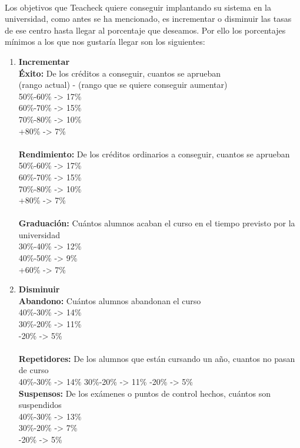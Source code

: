 \paragraph{}
Los objetivos que Teacheck quiere conseguir implantando su sistema en la universidad, como antes se ha mencionado, es incrementar o disminuir las tasas de ese centro hasta llegar al porcentaje que deseamos. Por ello los porcentajes mínimos a los que nos gustaría llegar son los siguientes:
\begin{enumerate}
\item\textbf{Incrementar}\\
\textbf{Éxito: } De los créditos a conseguir, cuantos se aprueban\\
(rango actual) - (rango que se quiere conseguir aumentar)\\
50\%-60\% -> 17\%\\
60\%-70\% -> 15\%\\
70\%-80\% -> 10\%\\
+80\% -> 7\%\\
\\
\textbf{Rendimiento: } De los créditos ordinarios a conseguir, cuantos se aprueban\\
50\%-60\% -> 17\%\\
60\%-70\% -> 15\%\\
70\%-80\% -> 10\%\\
+80\% -> 7\%\\
\\
\textbf{Graduación: } Cuántos alumnos acaban el curso en el tiempo previsto por la universidad\\
30\%-40\% -> 12\%\\
40\%-50\% -> 9\%\\
+60\% -> 7\%\\

\item\textbf{Disminuir}\\
\textbf{Abandono: } Cuántos alumnos abandonan el curso\\
40\%-30\% -> 14\%\\
30\%-20\% -> 11\%\\
-20\% -> 5\%\\
\\
\textbf{Repetidores: } De los alumnos que están cursando un año, cuantos no pasan de curso\\
40\%-30\% -> 14\%
30\%-20\% -> 11\%
-20\% -> 5\%
\\
\textbf{Suspensos: } De los exámenes o puntos de control hechos, cuántos son suspendidos\\
40\%-30\% -> 13\%\\
30\%-20\% -> 7\%\\
-20\% -> 5\%\\
\end{enumerate}

